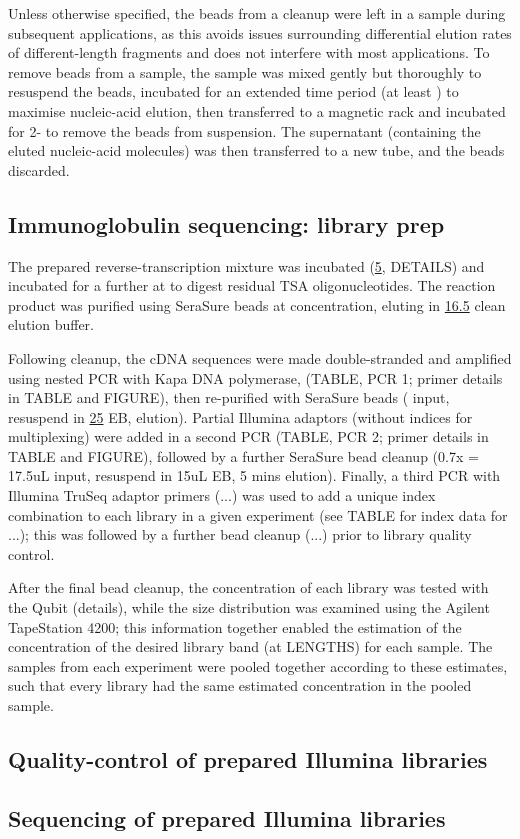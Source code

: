 
Unless otherwise specified, the beads from a cleanup were left in a sample during subsequent applications, as this avoids issues surrounding differential elution rates of different-length fragments and does not interfere with most applications. To remove beads from a sample, the sample was mixed gently but thoroughly to resuspend the beads, incubated for an extended time period (at least ) to maximise nucleic-acid elution, then transferred to a magnetic rack and incubated for 2- to remove the beads from suspension. The supernatant (containing the eluted nucleic-acid molecules) was then transferred to a new tube, and the beads discarded.

\subsection{Immunoglobulin sequencing: library prep} 
The prepared reverse-transcription mixture was incubated  (\ul{5}, DETAILS) and incubated for a further  at  to digest residual TSA oligonucleotides. The reaction product was purified using SeraSure beads at  concentration, eluting in \ul{16.5} clean elution buffer. %

Following cleanup, the cDNA sequences were made double-stranded and amplified using nested PCR with Kapa DNA polymerase, %
(TABLE, PCR 1; primer details in TABLE and FIGURE), then re-purified with SeraSure beads ( input, resuspend in \ul{25} EB,  elution). Partial Illumina adaptors (without indices for multiplexing) were added in a second PCR (TABLE, PCR 2; primer details in TABLE and FIGURE), followed by a further SeraSure bead cleanup (0.7x = 17.5uL input, resuspend in 15uL EB, 5 mins elution). Finally, a third PCR with Illumina TruSeq adaptor primers (...) was used to add a unique index combination to each library in a given experiment (see TABLE for index data for ...); this was followed by a further bead cleanup (...) prior to library quality control.

After the final bead cleanup, the concentration of each library was tested with the Qubit (details), while the size distribution was examined using the Agilent TapeStation 4200; this information together enabled the estimation of the concentration of the desired library band (at LENGTHS) for each sample. The samples from each experiment were pooled together according to these estimates, such that every library had the same estimated concentration in the pooled sample. 


\subsection{Quality-control of prepared Illumina libraries}

\subsection{Sequencing of prepared Illumina libraries}
